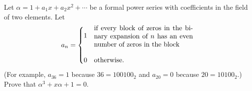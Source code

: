 Let $\alpha=1+a_1x+a_2x^2+\cdots$ be a formal power series with coefficients
in the field of two elements. Let
\[
a_n =
\begin{cases}
1 & \parbox{2in}{if every block of zeros in the binary expansion of $n$
has an even number of zeros in the block} \\[.3in]
0 & \text{otherwise.}
\end{cases}
\]
(For example, $a_{36}=1$ because $36=100100_2$ and $a_{20}=0$ because
$20=10100_2.$)
Prove that $\alpha^3+x\alpha+1=0.$
